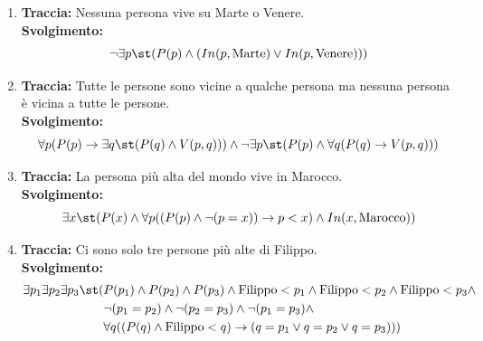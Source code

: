 \begin{enumerate}
    \item[(a)] \textbf{Traccia:} Nessuna persona vive su Marte o Venere. \\
    \textbf{Svolgimento:}
    \[ \neg\exists p \st (P(p)\wedge (In(p,\text{Marte})\vee In(p,\text{Venere}))) \]

    \item[(b)] \textbf{Traccia:} Tutte le persone sono vicine a qualche persona ma nessuna persona è vicina a tutte le persone. \\
    \textbf{Svolgimento:}
    \[ \forall p (P(p)\rightarrow \exists q \st (P(q)\wedge V(p,q))) \wedge \neg\exists p \st (P(p)\wedge \forall q (P(q)\rightarrow V(p,q))) \]

    \item[(c)] \textbf{Traccia:} La persona più alta del mondo vive in Marocco. \\
    \textbf{Svolgimento:}
    \[ \exists x \st (P(x)\wedge \forall p ((P(p)\wedge \neg(p=x))\rightarrow p<x) \wedge In(x,\text{Marocco})) \]

    \item[(d)] \textbf{Traccia:} Ci sono solo tre persone più alte di Filippo. \\
    \textbf{Svolgimento:}
    \begin{align*} 
        \exists p_1 \exists p_2 \exists p_3 \st (&P(p_1) \wedge P(p_2) \wedge P(p_3) \wedge \text{Filippo} < p_1 \wedge \text{Filippo} < p_2 \wedge \text{Filippo} < p_3 \wedge \\
        & \neg(p_1=p_2) \wedge \neg(p_2=p_3) \wedge \neg(p_1=p_3) \wedge \\
        & \forall q ((P(q) \wedge \text{Filippo} < q) \rightarrow (q=p_1 \vee q=p_2 \vee q=p_3))) 
    \end{align*}


\end{enumerate}
